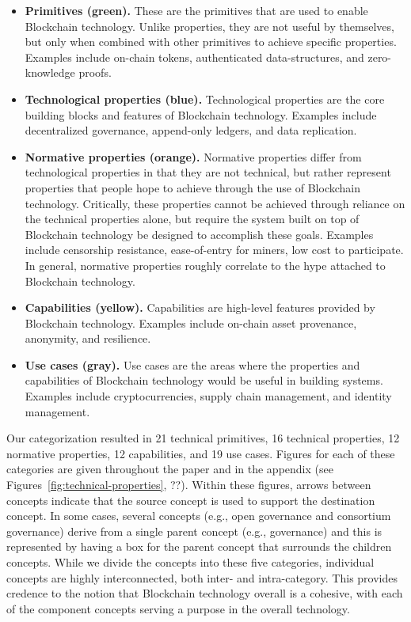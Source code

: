  \renewcommand{\labelitemi}{$\blacksquare$}
\begin{itemize}
	\item \textbf{Primitives (green).} These are the primitives that are used to enable Blockchain technology. Unlike properties, they are not useful by themselves, but only when combined with other primitives to achieve specific properties. Examples include on-chain tokens, authenticated data-structures, and zero-knowledge proofs.
	
	\item \textbf{Technological properties (blue).} Technological properties are the core building blocks and features of Blockchain technology. Examples include decentralized governance, append-only ledgers, and data replication.
	
	\item \textbf{Normative properties (orange).} Normative properties differ from technological properties in that they are not technical, but rather represent properties that people hope to achieve through the use of Blockchain technology. Critically, these properties cannot be achieved through reliance on the technical properties alone, but require the system built on top of Blockchain technology be designed to accomplish these goals. Examples include censorship resistance, ease-of-entry for miners, low cost to participate.
	In general, normative properties roughly correlate to the hype attached to Blockchain technology.

	\item \textbf{Capabilities (yellow).} Capabilities are high-level features provided by Blockchain technology. Examples include on-chain asset provenance, anonymity, and resilience.
	
	\item \textbf{Use cases (gray).} Use cases are the areas where the properties and capabilities of Blockchain technology would be useful in building systems. Examples include cryptocurrencies, supply chain management, and identity management.
\end{itemize}
 \renewcommand{\labelitemi}{\textbullet}

Our categorization resulted in 21 technical primitives, 16 technical properties, 12 normative properties, 12 capabilities, and 19 use cases.
Figures for each of these categories are given throughout the paper and in the appendix (see Figures~\ref{fig:technical-properties}, ??).
Within these figures, arrows between concepts indicate that the source concept is used to support the destination concept.
In some cases, several concepts (e.g., open governance and consortium governance) derive from a single parent concept (e.g., governance) and this is represented by having a box for the parent concept that surrounds the children concepts.
While we divide the concepts into these five categories, individual concepts are highly interconnected, both inter- and intra-category. 
This provides credence to the notion that Blockchain technology overall is a cohesive, with each of the component concepts serving a purpose in the overall technology.

